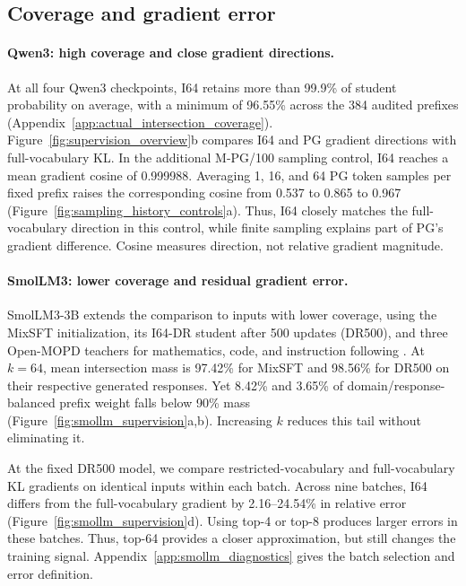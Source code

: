 \subsection{Coverage and gradient error}
\label{sec:coverage_gradient}

\paragraph{Qwen3: high coverage and close gradient directions.}
At all four Qwen3 checkpoints, I64 retains more than 99.9\% of student probability on average, with a minimum of 96.55\% across the 384 audited prefixes (Appendix~\ref{app:actual_intersection_coverage}). Figure~\ref{fig:supervision_overview}b compares I64 and PG gradient directions with full-vocabulary KL. In the additional M-PG/100 sampling control, I64 reaches a mean gradient cosine of 0.999988. Averaging 1, 16, and 64 PG token samples per fixed prefix raises the corresponding cosine from 0.537 to 0.865 to 0.967 (Figure~\ref{fig:sampling_history_controls}a). Thus, I64 closely matches the full-vocabulary direction in this control, while finite sampling explains part of PG's gradient difference. Cosine measures direction, not relative gradient magnitude.



\paragraph{SmolLM3: lower coverage and residual gradient error.}
SmolLM3-3B extends the comparison to inputs with lower coverage, using the MixSFT initialization, its I64-DR student after 500 updates (DR500), and three Open-MOPD teachers for mathematics, code, and instruction following \citep{gao2026openmopddiagnosingfixingcapability}. At $k=64$, mean intersection mass is 97.42\% for MixSFT and 98.56\% for DR500 on their respective generated responses. Yet 8.42\% and 3.65\% of domain/response-balanced prefix weight falls below 90\% mass (Figure~\ref{fig:smollm_supervision}a,b). Increasing $k$ reduces this tail without eliminating it.

At the fixed DR500 model, we compare restricted-vocabulary and full-vocabulary KL gradients on identical inputs within each batch. Across nine batches, I64 differs from the full-vocabulary gradient by 2.16--24.54\% in relative error (Figure~\ref{fig:smollm_supervision}d). Using top-4 or top-8 produces larger errors in these batches. Thus, top-64 provides a closer approximation, but still changes the training signal. Appendix~\ref{app:smollm_diagnostics} gives the batch selection and error definition.

